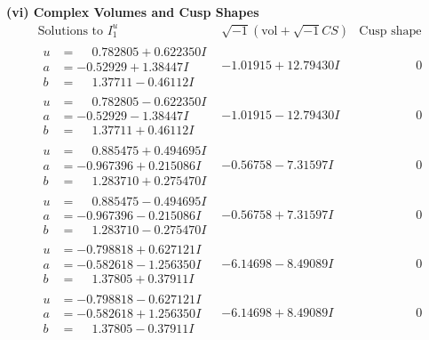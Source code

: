 \documentclass[1p]{elsarticle_modified}
\theoremstyle{definition}
\newcommand{\I}{\sqrt{-1}}
\begin{document}
\newpage\flushleft \textbf{(vi) Complex Volumes and Cusp Shapes}
$$\begin{array}{c|c|c}  
\text{Solutions to }I^u_{1}& \I (\text{vol} + \sqrt{-1}CS) & \text{Cusp shape}\\
 \hline 
\begin{aligned}
u &= \phantom{-}0.782805 + 0.622350 I \\
a &= -0.52929 + 1.38447 I \\
b &= \phantom{-}1.37711 - 0.46112 I\end{aligned}
 & -1.01915 + 12.79430 I & \phantom{-0.000000 } 0 \\ \hline\begin{aligned}
u &= \phantom{-}0.782805 - 0.622350 I \\
a &= -0.52929 - 1.38447 I \\
b &= \phantom{-}1.37711 + 0.46112 I\end{aligned}
 & -1.01915 - 12.79430 I & \phantom{-0.000000 } 0 \\ \hline\begin{aligned}
u &= \phantom{-}0.885475 + 0.494695 I \\
a &= -0.967396 + 0.215086 I \\
b &= \phantom{-}1.283710 + 0.275470 I\end{aligned}
 & -0.56758 - 7.31597 I & \phantom{-0.000000 } 0 \\ \hline\begin{aligned}
u &= \phantom{-}0.885475 - 0.494695 I \\
a &= -0.967396 - 0.215086 I \\
b &= \phantom{-}1.283710 - 0.275470 I\end{aligned}
 & -0.56758 + 7.31597 I & \phantom{-0.000000 } 0 \\ \hline\begin{aligned}
u &= -0.798818 + 0.627121 I \\
a &= -0.582618 - 1.256350 I \\
b &= \phantom{-}1.37805 + 0.37911 I\end{aligned}
 & -6.14698 - 8.49089 I & \phantom{-0.000000 } 0 \\ \hline\begin{aligned}
u &= -0.798818 - 0.627121 I \\
a &= -0.582618 + 1.256350 I \\
b &= \phantom{-}1.37805 - 0.37911 I\end{aligned}
 & -6.14698 + 8.49089 I & \phantom{-0.000000 } 0 \\ \hline\begin{aligned}

\end{aligned}
\end{array}$$
\end{document}
